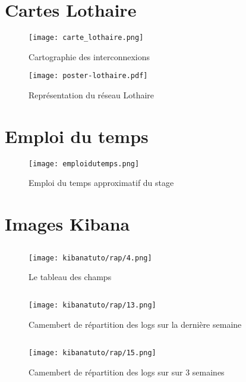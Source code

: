 \section{Cartes Lothaire}
\begin{figure}[H]
    \center
    \texttt{[image: carte\_lothaire.png]}
    \label{fig:imagereseaulothaire1}
    \caption{Cartographie des interconnexions}
\end{figure}
\begin{figure}[H]
    \center
    \texttt{[image: poster-lothaire.pdf]}
    \label{fig:imagereseaulothaire2}
    \caption{Représentation du réseau Lothaire}
\end{figure}

\section{Emploi du temps}
\begin{figure}[H]
    \center
    \texttt{[image: emploidutemps.png]}
    \label{fig:emploidutemps}
    \caption{Emploi du temps approximatif du stage}
\end{figure}

\section{Images Kibana}
\subsection{}
\begin{figure}[H]
\center
\texttt{[image: kibanatuto/rap/4.png]}
\label{fig:kibanatuto4}
\caption{Le tableau des champs}
\end{figure}
\subsection{}
\begin{figure}[H]
\center
\texttt{[image: kibanatuto/rap/13.png]}
\label{fig:kibanatuto8}
\caption{Camembert de répartition des logs sur la dernière semaine}
\end{figure}
\subsection{}
\begin{figure}[H]
\center
\texttt{[image: kibanatuto/rap/15.png]}
\label{fig:kibanatuto9}
\caption{Camembert de répartition des logs sur sur 3 semaines}
\end{figure}
